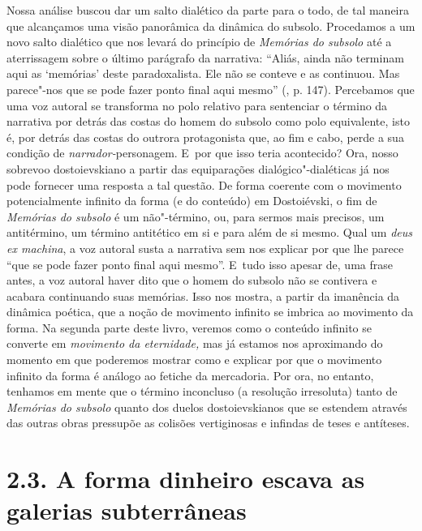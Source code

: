Nossa análise buscou dar um salto dialético da parte para o todo, de tal
maneira que alcançamos uma visão panorâmica da dinâmica do subsolo.
Procedamos a um novo salto dialético que nos levará do princípio de
\emph{Memórias do subsolo} até a aterrissagem sobre o último parágrafo
da narrativa: ``Aliás, ainda não terminam aqui as `memórias' deste
paradoxalista. Ele não se conteve e as continuou. Mas parece"-nos que se
pode fazer ponto final aqui mesmo'' (, p. 147). Percebamos que uma
voz autoral se transforma no polo relativo para sentenciar o término da
narrativa por detrás das costas do homem do subsolo como polo
equivalente, isto é, por detrás das costas do outrora protagonista que,
ao fim e cabo, perde a sua condição de \emph{narrador-}personagem. E~por
que isso teria acontecido? Ora, nosso sobrevoo dostoievskiano a partir
das equiparações dialógico"-dialéticas já nos pode fornecer uma resposta
a tal questão. De forma coerente com o movimento potencialmente infinito
da forma (e do conteúdo) em Dostoiévski, o fim de \emph{Memórias do
subsolo} é um não"-término, ou, para sermos mais precisos, um
antitérmino, um término antitético em si e para além de si mesmo. Qual
um \emph{deus ex machina}, a voz autoral susta a narrativa sem nos
explicar por que lhe parece ``que se pode fazer ponto final aqui
mesmo''. E~tudo isso apesar de, uma frase antes, a voz autoral haver
dito que o homem do subsolo não se contivera e acabara continuando suas
memórias. Isso nos mostra, a partir da imanência da dinâmica poética,
que a noção de movimento infinito se imbrica ao movimento da forma. Na
segunda parte deste livro, veremos como o conteúdo infinito se converte
em \emph{movimento da eternidade,} mas já estamos nos aproximando do
momento em que poderemos mostrar como e explicar por que o movimento
infinito da forma é análogo ao fetiche da mercadoria. Por ora, no
entanto, tenhamos em mente que o término inconcluso (a resolução
irresoluta) tanto de \emph{Memórias do subsolo} quanto dos duelos
dostoievskianos que se estendem através das outras obras pressupõe as
colisões vertiginosas e infindas de teses e antíteses.

\section{2.3. A forma dinheiro escava as galerias subterrâneas}

